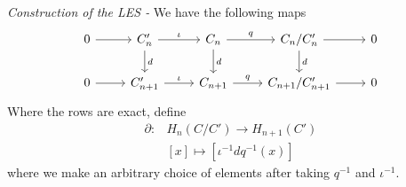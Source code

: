 \documentclass[11pt]{article}
\theoremstyle{definition}
\begin{document}
    \emph{Construction of the LES - } We have the following maps
    \begin{equation*}
        \begin{tikzcd}
            0 \arrow[r,"{}"] &C_n' \arrow[r,"{\iota}"] \arrow[d,"{d}"] &C_n \arrow[r,"{q}"] \arrow[d,"{d}"] &C_n/C_n' \arrow[d,"{d}"] \arrow[r,"{}"] &0 \\
            0 \arrow[r,"{}"] &C_{n+1}' \arrow[r,"{\iota}"] &C_{n+1} \arrow[r,"{q}"] &C_{n+1}/C_{n+1}' \arrow[r,"{}"] &0
        \end{tikzcd}
    \end{equation*}
    Where the rows are exact, define
    \begin{align*}
        \partial: &H_n(C/C') \to H_{n+1}(C') \\
        &[x] \mapsto [\iota^{-1}dq^{-1}(x)]
    \end{align*}
    where we make an arbitrary choice of elements after taking \(q^{-1}\) and \(\iota^{-1}\).
\end{document}
